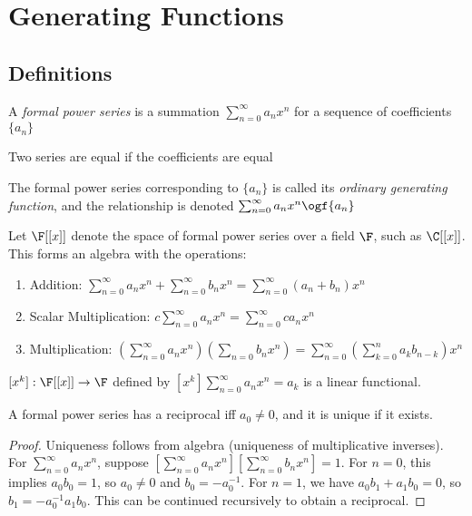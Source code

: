 \documentclass[a4paper]{article}
\begin{document}
\section{Generating Functions}

\subsection{Definitions}

\begin{definition}
A \emph{formal power series} is a summation $\sum_{n=0}^\infty a_nx^n$ for a sequence of coefficients $\{a_n\}$
\begin{arrows}
\item Two series are equal if the coefficients are equal
\item The formal power series corresponding to $\{a_n\}$ is called its \emph{ordinary generating function}, and the relationship is denoted $\sum_{n=0}^\infty a_nx^n\ogf \{a_n\}$
\end{arrows}
\end{definition}

\begin{proposition}
Let $\F[[x]]$ denote the space of formal power series over a field $\F$, such as $\C[[x]]$. This forms an algebra with the operations:
\begin{enumerate}[label=(\roman*)]
\item Addition: $\displaystyle\sum_{n=0}^\infty a_nx^n+\sum_{n=0}^\infty b_nx^n=\sum_{n=0}^\infty(a_n+b_n)x^n$
\item Scalar Multiplication: $\displaystyle c\sum_{n=0}^\infty a_nx^n=\sum_{n=0}^\infty ca_nx^n$
\item Multiplication: $\displaystyle\left(\sum_{n=0}^\infty a_nx^n\right)\left(\sum_{n=0}b_nx^n\right)=\sum_{n=0}^\infty\left(\sum_{k=0}^na_kb_{n-k}\right)x^n$
\end{enumerate}
\end{proposition}

\begin{definition}
$[x^k]:\F[[x]]\rightarrow\F$ defined by $[x^k]\sum_{n=0}^\infty a_nx^n=a_k$ is a linear functional.
\end{definition}

\begin{theorem}
A formal power series has a reciprocal iff $a_0\neq0$, and it is unique if it exists.

\begin{hl}
\begin{proof}
Uniqueness follows from algebra (uniqueness of multiplicative inverses). For $\sum_{n=0}^\infty a_nx^n$, suppose $\left[\sum_{n=0}^\infty a_nx^n\right]\left[\sum_{n=0}^\infty b_nx^n\right]=1$. For $n=0$, this implies $a_0b_0=1$, so $a_0\neq0$ and $b_0=-a_0^{-1}$. For $n=1$, we have $a_0b_1+a_1b_0=0$, so $b_1=-a_0^{-1}a_1b_0$. This can be continued recursively to obtain a reciprocal.
\end{proof}
\end{hl}
\end{theorem}
\end{document}
